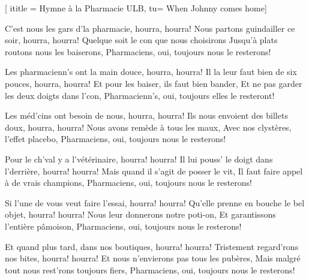  [
ititle = {Hymne à la Pharmacie ULB},
tu= {When Johnny comes home}]

\beginverse
C'est nous les gars d'la pharmacie, hourra, hourra!
Nous partons guindailler ce soir, hourra, hourra!
Quelque soit le con que nous choisirons
Jusqu'à plats routons nous les baiserons,
Pharmaciens, oui, toujours nous le resterons!
\endverse

\beginverse
Les pharmacienn's ont la main douce, hourra, hourra!
Il la leur faut bien de six pouces, hourra, hourra!
Et pour les baiser, ils faut bien bander,
Et ne pas garder les deux doigts dans l'con,
Pharmacienn's, oui, toujours elles le resteront!
\endverse

\beginverse
Les méd'cins ont besoin de nous, hourra, hourra!
Ils nous envoient des billets doux, hourra, hourra!
Nous avons remède à tous les maux,
Avec nos clystères, l'effet placebo,
Pharmaciens, oui, toujours nous le resterons!
\endverse

\beginverse
Pour le ch'val y a l'vétérinaire, hourra! hourra!
Il lui pouss' le doigt dans l'derrière, hourra! hourra!
Mais quand il s'agit de posser le vit,
Il faut faire appel à de vrais champions,
Pharmaciens, oui, toujours nous le resterons!
\endverse

\beginverse
Si l'une de vous veut faire l'essai, hourra! hourra!
Qu'elle prenne en bouche le bel objet, hourra! hourra!
Nous leur donnerons notre poti-on,
Et garantissons l'entière pâmoison,
Pharmaciens, oui, toujours nous le resterons!
\endverse

\beginverse
Et quand plus tard, dans nos boutiques, hourra! hourra!
Tristement regard'rons nos bites, hourra! hourra!
Et nous n'envierons pas tous les pubères, 
Mais malgré tout nous rest'rons toujours fiers,
Pharmaciens, oui, toujours nous le resterons!
\endverse

\endsong